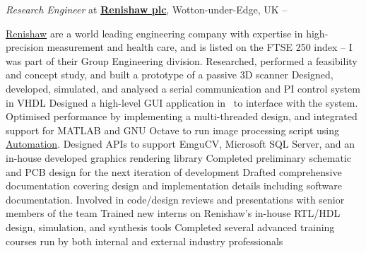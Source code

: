 \documentclass[a4paper,10pt,oneside]{article}
\begin{document}
\begin{body}
\textit{Research Engineer} at
\href{https://www.renishaw.com/}
{\textbf{Renishaw plc}},
Wotton-under-Edge, UK
\hfill
{} --
{}
\begin{detailwithoutsubheading}
\href{https://www.renishaw.com/}{Renishaw} are a world leading engineering company with expertise in high-precision measurement and health care, and is listed on the FTSE 250 index -- I was part of their Group Engineering division.
\BulletItem
Researched, performed a feasibility and concept study, and built a prototype of a passive 3D scanner
\BulletItem
Designed, developed, simulated, and analysed a serial communication and PI control system in VHDL 
\BulletItem
Designed a high-level GUI application in \Csharp \ to interface with the system. Optimised performance by implementing a multi-threaded design, and integrated support for MATLAB and GNU Octave to run image processing script using \href{https://msdn.microsoft.com/en-us/library/windows/desktop/ms221375(v=vs.85).aspx}{Automation}. Designed APIs to support EmguCV, Microsoft SQL Server, and an in-house developed graphics rendering library
\BulletItem
Completed preliminary schematic and PCB design for the next iteration of development
\BulletItem
Drafted comprehensive documentation covering design and implementation details including software documentation. Involved in code/design reviews and presentations with senior members of the team
\BulletItem
Trained new interns on Renishaw's in-house RTL/HDL design, simulation, and synthesis tools
\BulletItem
Completed several advanced training courses run by both internal and external industry professionals
\end{detailwithoutsubheading}


\end{body}
\end{document}
